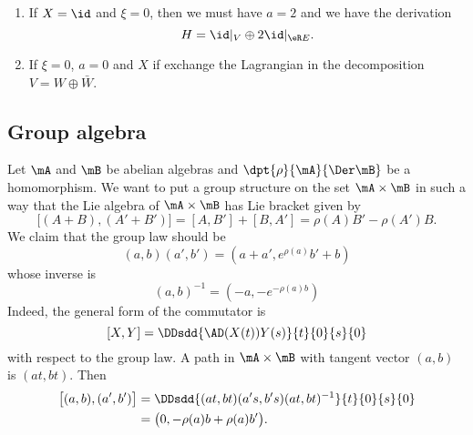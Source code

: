 \begin{enumerate}

    \item
        If $X=\id$ and $\xi=0$, then we must have $a=2$ and we have the derivation
        \begin{equation}
            H=\id|_V\oplus 2\id|_{\eR E}.
        \end{equation}
    \item
        If $\xi=0$, $a=0$ and $X$ if exchange the Lagrangian in the decomposition $V=W\oplus \bar W$.
\end{enumerate}

\subsection{Group algebra}

Let $\mA$ and $\mB$ be abelian algebras and $\dpt{\rho}{\mA}{\Der\mB}$ be a homomorphism. We want to put a group structure on the set $\mA\times\mB$ in such a way that the Lie algebra of $\mA\times\mB$ has Lie bracket given by
\begin{equation}
\big[ (A+B),(A'+B')  \big]=[A,B']+[B,A']=\rho(A)B'-\rho(A')B.
\end{equation}
We claim that the group law should be 
\begin{equation}
(a,b)(a',b')=(a+a',e^{\rho(a)}b'+b)
\end{equation}
whose inverse is 
\begin{equation}
(a,b)^{-1}=(-a,-e^{-\rho(a)b})
\end{equation}
Indeed, the general form of the commutator is 
\[ 
  [X,Y]=\DDsdd{ \AD(X(t))Y(s) }{t}{0}{s}{0}
\]
with respect to the group law. A path in $\mA\times\mB$ with tangent vector $(a,b)$ is $(at,bt)$. Then
\begin{equation}
\begin{split}
\big[ (a,b),(a',b') \big]&=\DDsdd{ (at,bt)(a's,b's)(at,bt)^{-1} }{t}{0}{s}{0}\\
            &=\big(0,-\rho(a)b+\rho(a)b'\big).
\end{split}
\end{equation}
